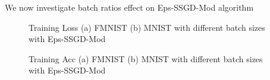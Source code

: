\documentclass[a4paper,twoside]{iiththesis}
\theoremstyle{definition}
\theoremstyle{definition}
\theoremstyle{remark}
\begin{document}
We now investigate batch ratios effect on Eps-SSGD-Mod algorithm
\begin{figure}
%
%

\caption{Training Loss (a) FMNIST (b) MNIST with different batch sizes with Eps-SSGD-Mod }
%
%
    \caption{Training Acc (a) FMNIST (b) MNIST with different batch sizes with Eps-SSGD-Mod}
    \label{fig:Emnist Learning Rate Loss}
\end{figure}
\end{document}
